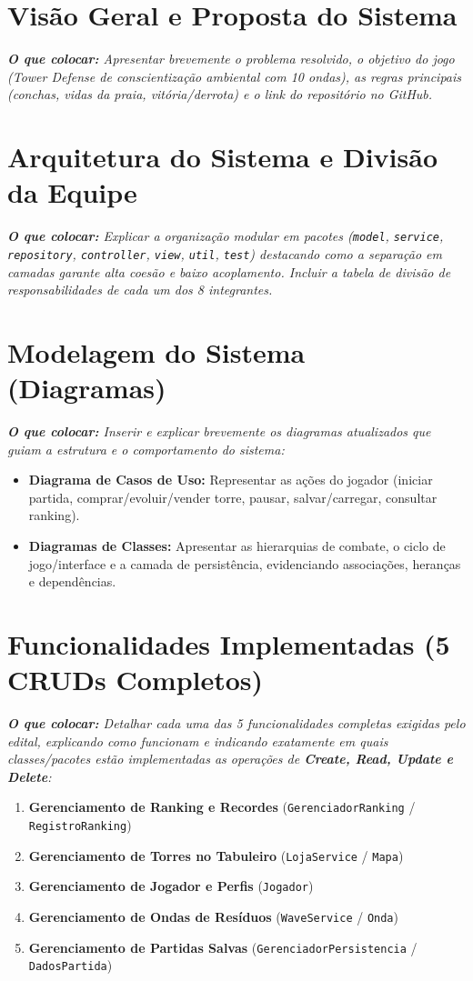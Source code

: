 \documentclass[11pt,a4paper]{article}
\begin{document}
\section{Visão Geral e Proposta do Sistema}
\textit{\textbf{O que colocar:} Apresentar brevemente o problema resolvido, o objetivo do jogo (Tower Defense de conscientização ambiental com 10 ondas), as regras principais (conchas, vidas da praia, vitória/derrota) e o link do repositório no GitHub.}

\section{Arquitetura do Sistema e Divisão da Equipe}
\textit{\textbf{O que colocar:} Explicar a organização modular em pacotes (\texttt{model}, \texttt{service}, \texttt{repository}, \texttt{controller}, \texttt{view}, \texttt{util}, \texttt{test}) destacando como a separação em camadas garante alta coesão e baixo acoplamento. Incluir a tabela de divisão de responsabilidades de cada um dos 8 integrantes.}

\section{Modelagem do Sistema (Diagramas)}
\textit{\textbf{O que colocar:} Inserir e explicar brevemente os diagramas atualizados que guiam a estrutura e o comportamento do sistema:}
\begin{itemize}
    \item \textbf{Diagrama de Casos de Uso:} Representar as ações do jogador (iniciar partida, comprar/evoluir/vender torre, pausar, salvar/carregar, consultar ranking).
    \item \textbf{Diagramas de Classes:} Apresentar as hierarquias de combate, o ciclo de jogo/interface e a camada de persistência, evidenciando associações, heranças e dependências.
\end{itemize}

\section{Funcionalidades Implementadas (5 CRUDs Completos)}
\textit{\textbf{O que colocar:} Detalhar cada uma das 5 funcionalidades completas exigidas pelo edital, explicando como funcionam e indicando exatamente em quais classes/pacotes estão implementadas as operações de \textbf{Create, Read, Update e Delete}:}
\begin{enumerate}
    \item \textbf{Gerenciamento de Ranking e Recordes} (\texttt{GerenciadorRanking} / \texttt{RegistroRanking})
    \item \textbf{Gerenciamento de Torres no Tabuleiro} (\texttt{LojaService} / \texttt{Mapa})
    \item \textbf{Gerenciamento de Jogador e Perfis} (\texttt{Jogador})
    \item \textbf{Gerenciamento de Ondas de Resíduos} (\texttt{WaveService} / \texttt{Onda})
    \item \textbf{Gerenciamento de Partidas Salvas} (\texttt{GerenciadorPersistencia} / \texttt{DadosPartida})
\end{enumerate}
\end{document}
